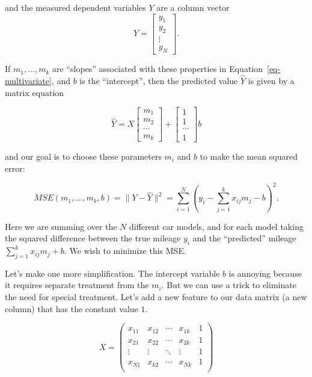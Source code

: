 \documentclass[
  11pt,
  letterpaper,
]{scrbook}
\theoremstyle{plain}
\theoremstyle{plain}
\theoremstyle{remark}
\begin{document}
and the measured dependent variables \(Y\) are a column vector \[ Y =
\left[\begin{matrix} y_1 \\ y_2 \\ \vdots \\ y_N\end{matrix}\right].
\]

If \(m_1,\ldots, m_k\) are ``slopes'' associated with these properties
in Equation~\ref{eq-multivariate}, and \(b\) is the ``intercept'', then
the predicted value \(\hat{Y}\) is given by a matrix equation

\[ 
\hat{Y} = X\left[\begin{matrix} m_1 \\ m_2 \\ \cdots \\
m_k\end{matrix}\right]+\left[\begin{matrix} 1 \\ 1 \\ \cdots \\
1\end{matrix}\right]b 
\]

and our goal is to choose these parameters \(m_i\) and \(b\) to make the
mean squared error:

\[ MSE(m_1,\ldots, m_k,b) = \|Y-\hat{Y}\|^2 = \sum_{i=1}^{N} (y_i -
\sum_{j=1}^{k} x_{ij}m_j -b )^2.
\]

Here we are summing over the \(N\) different car models, and for each
model taking the squared difference between the true mileage \(y_i\) and
the ``predicted'' mileage \(\sum_{j=1}^{k} x_{ij}m_j +b\). We wish to
minimize this MSE.

Let's make one more simplification. The intercept variable \(b\) is
annoying because it requires separate treatment from the \(m_i\). But we
can use a trick to eliminate the need for special treatment. Let's add a
new feature to our data matrix (a new column) that has the constant
value \(1\).

\[ X = \left(\begin{matrix} x_{11} & x_{12} & \cdots & x_{1k} & 1\\
x_{21} & x_{22} & \cdots & x_{2k} & 1\\ \vdots & \vdots & \ddots &
\vdots & 1\\ x_{N1} & x_{k2} & \cdots & x_{Nk} & 1\\
\end{matrix}\right)
\]
\end{document}
